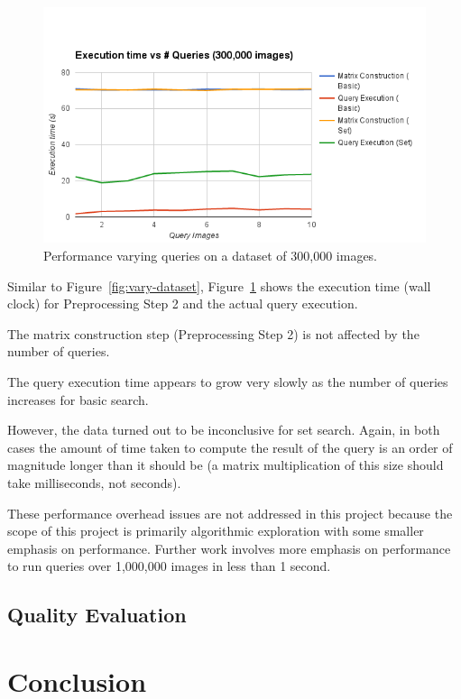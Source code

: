 \begin{figure}[t]
    \begin{minipage}{1.0\columnwidth}
        \centering
        \includegraphics[width=0.9\columnwidth]{figs/vary-queries}
    \end{minipage}
    \caption{Performance varying queries on a dataset of 300,000 images.}
    \label{fig:vary-queries}
\end{figure}

Similar to Figure~\ref{fig:vary-dataset}, Figure~\ref{fig:vary-queries} shows the execution time (wall clock) for Preprocessing Step 2 and the actual query execution.

The matrix construction step (Preprocessing Step 2) is not affected by the number of queries.

The query execution time appears to grow very slowly as the number of queries increases for basic search.

However, the data turned out to be inconclusive for set search.
Again, in both cases the amount of time taken to compute the result of the query is an order of magnitude longer than it should be
(a matrix multiplication of this size should take milliseconds, not seconds).

These performance overhead issues are not addressed in this project because the scope of this project is primarily
algorithmic exploration with some smaller emphasis on performance.
Further work involves more emphasis on performance to run queries over 1,000,000 images in less than 1 second.

\subsection{Quality Evaluation}

\section{Conclusion}
